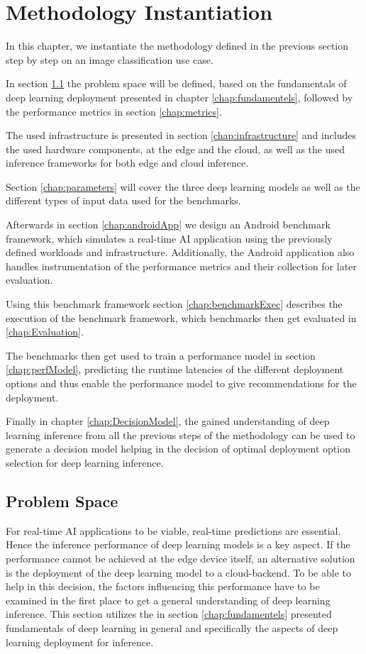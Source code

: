 \chapter{Methodology Instantiation}
\label{chap:experiments}
In this chapter, we instantiate the methodology defined in the previous section step by step on an image classification use case.

In section \ref{chap:problemSpace} the problem space will be defined, based on the fundamentals of deep learning deployment presented in chapter \ref{chap:fundamentels}, followed by the performance metrics in section \ref{chap:metrics}.


The used infrastructure is presented in section \ref{chap:infrastructure} and includes the used hardware components, at the edge and the cloud, as well as the used inference frameworks for both edge and cloud inference.

Section \ref{chap:parameters} will cover the three deep learning models as well as the different types of input data used for the benchmarks.

Afterwards in section \ref{chap:androidApp} we design an Android benchmark framework, which simulates a real-time AI application using the previously defined workloads and infrastructure. Additionally, the Android application also handles instrumentation of the performance metrics and their collection for later evaluation.

Using this benchmark framework section \ref{chap:benchmarkExec} describes the execution of the benchmark framework, which benchmarks then get evaluated in \ref{chap:Evaluation}.

The benchmarks then get used to train a performance model in section \ref{chap:perfModel}, predicting the runtime latencies of the different deployment options and thus enable the performance model to give recommendations for the deployment.

Finally in chapter \ref{chap:DecisionModel}, the gained understanding of deep learning inference from all the previous steps of the methodology can be used to generate a decision model helping in the decision of optimal deployment option selection for deep learning inference.


\section{Problem Space}
\label{chap:problemSpace}
For real-time AI applications to be viable, real-time predictions are essential. Hence the inference performance of deep learning models is a key aspect.
If the performance cannot be achieved at the edge device itself, an alternative solution is the deployment of the deep learning model to a cloud-backend.
To be able to help in this decision, the factors influencing this performance have to be examined in the first place to get a general understanding of deep learning inference.
This section utilizes the in section \ref{chap:fundamentels} presented fundamentals of deep learning in general and specifically the aspects of deep learning deployment for inference.

